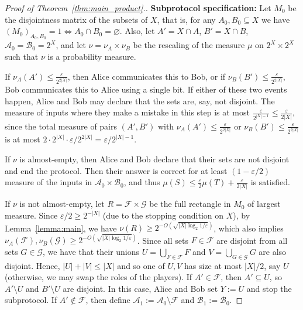\documentclass[11pt]{amsart}
\theoremstyle{definition}
\def\eps{\varepsilon}
\def\cA{\mathcal{A}}
\def\cB{\mathcal{B}}
\def\cF{\mathcal{F}}
\def\cG{\mathcal{G}}
\begin{document}
\begin{proof}[Proof of Theorem~\ref{thm:main_product}.]
\medskip\noindent
\textbf{Subprotocol specification:} Let $M_0$ be the disjointness matrix of the subsets of $X$, that is, for any $A_0, B_0\subseteq X$ we have $(M_0)_{A_0, B_0}=1 \Longleftrightarrow A_0\cap B_0=\varnothing$. Also, let $A'=X\cap A$, $B'=X\cap B$, $\cA_0=\cB_0=2^X$, and let $\nu=\nu_{A}\times \nu_{B}$ be the rescaling of the measure $\mu$ on $2^X\times 2^X$ such that $\nu$ is a probability measure. 

If $\nu_{A}(A')\leq \frac{\eps}{2^{2|X|}}$, then Alice communicates this to Bob, or if $\nu_{B}(B')\leq \frac{\eps}{2^{2|X|}}$, Bob communicates this to Alice using a single bit. If either of these two events happen, Alice and Bob may declare that the sets are, say, not disjoint. The measure of inputs where they make a mistake in this step is at most $\frac{\eps}{2^{|X|-1}}\leq \frac{\eps}{2|X|}$, since the total measure of pairs $(A', B')$ with $\nu_{A}(A')\leq \frac{\eps}{2^{2|X|}}$ or $\nu_{B}(B')\leq \frac{\eps}{2^{2|X|}}$ is at most $2\cdot 2^{|X|}\cdot {\eps}/{2^{2|X|}}=\eps/2^{|X|-1}$.

If $\nu$ is almost-empty, then Alice and Bob declare that their sets are not disjoint and end the protocol. Then their answer is correct for at least $(1-\eps/2)$ measure of the inputs in $\cA_0\times \cB_0$, and thus $\mu(S)\leq \frac{\eps}{2}\mu(T)+\frac{\eps}{2|X|}$ is satisfied.

If $\nu$ is not almost-empty, let $R=\cF\times \cG$ be the full rectangle in $M_0$ of largest measure. Since $\eps/2\geq 2^{-|X|}$ (due to the stopping condition on $X$), by Lemma~\ref{lemma:main}, we have $\nu(R)\geq 2^{-O(\sqrt{|X|\log_2 1/\eps})}$, which also implies $\nu_{A}(\cF),\nu_{B}(\cG)\geq 2^{-O(\sqrt{|X|\log_2 1/\eps})}$. Since all sets $F\in \cF$ are disjoint from all sets $G\in \cG$, we have that their unions $U=\bigcup_{F\in \cF}F$ and $V=\bigcup_{G\in \cG}G$ are also disjoint. Hence, $|U|+|V|\leq |X|$ and so one of $U, V$ has size at most $|X|/2$, say $U$ (otherwise, we may swap the roles of the players). If $A'\in \cF$, then $A'\subseteq U$, so $A'\setminus U$ and $B'\setminus U$ are disjoint. In this case, Alice and Bob set $Y:=U$ and stop the subprotocol. If $A'\notin \cF$, then define $\cA_{1}:=\cA_0\setminus \cF$ and $\cB_{1}:=\cB_0$.


\end{proof}
\end{document}
